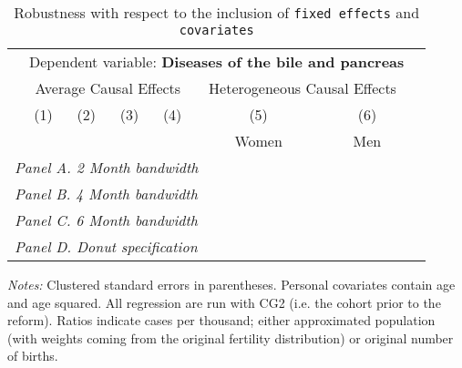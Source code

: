  \begin{table}[H] \begin{threeparttable} \centering \caption{Robustness with respect to the inclusion of \texttt{fixed effects} and \texttt{covariates}} {\def\sym#1{\ifmmode^{#1}\else\(^{#1}\)\fi} \begin{tabular}{l*{7}{c}} \toprule & \multicolumn{6}{c}{Dependent variable: \textbf{Diseases of the bile and pancreas}} \\ \cmidrule(lr){2-7}
            &\multicolumn{4}{c}{Average Causal Effects}         &\multicolumn{2}{c}{Heterogeneous Causal Effects}\\\cmidrule(lr){2-5}\cmidrule(lr){6-7}
            &\multicolumn{1}{c}{(1)}&\multicolumn{1}{c}{(2)}&\multicolumn{1}{c}{(3)}&\multicolumn{1}{c}{(4)}&\multicolumn{1}{c}{(5)}&\multicolumn{1}{c}{(6)}\\
            &\multicolumn{1}{c}{}&\multicolumn{1}{c}{}&\multicolumn{1}{c}{}&\multicolumn{1}{c}{}&\multicolumn{1}{c}{Women}&\multicolumn{1}{c}{Men}\\
\midrule
 \multicolumn{7}{l}{\emph{Panel A. 2 Month bandwidth}} \\    \midrule\multicolumn{7}{l}{\emph{Panel B. 4 Month bandwidth}} \\    \midrule\multicolumn{7}{l}{\emph{Panel C. 6 Month bandwidth}} \\    \midrule\multicolumn{7}{l}{\emph{Panel D. Donut specification}} \\    \midrule  
\bottomrule \end{tabular} } \begin{tablenotes} \item \scriptsize \emph{Notes:} Clustered standard errors in parentheses. Personal covariates contain age and age squared. All regression are run with CG2 (i.e. the cohort prior to the reform). Ratios indicate cases per thousand; either approximated population (with weights coming from the original fertility distribution) or original number of births. \end{tablenotes} \end{threeparttable} \end{table} 
